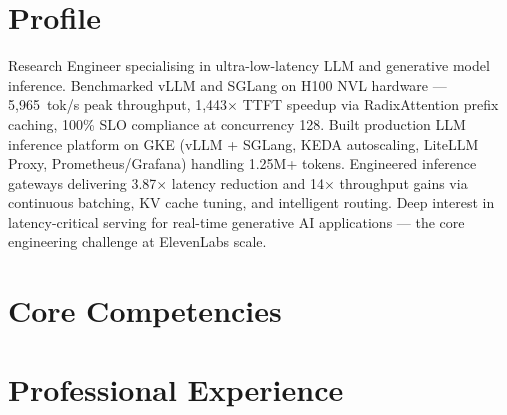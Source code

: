 \documentclass[11pt,a4paper]{moderncv}
\begin{document}
\makecvtitle

\section{Profile}
Research Engineer specialising in ultra-low-latency LLM and generative model inference. Benchmarked vLLM and SGLang on H100 NVL hardware — 5,965~tok/s peak throughput, 1,443$\times$ TTFT speedup via RadixAttention prefix caching, 100\% SLO compliance at concurrency 128. Built production LLM inference platform on GKE (vLLM + SGLang, KEDA autoscaling, LiteLLM Proxy, Prometheus/Grafana) handling 1.25M+ tokens. Engineered inference gateways delivering 3.87$\times$ latency reduction and 14$\times$ throughput gains via continuous batching, KV cache tuning, and intelligent routing. Deep interest in latency-critical serving for real-time generative AI applications — the core engineering challenge at ElevenLabs scale.

\section{Core Competencies}

\section{Professional Experience}
\end{document}
